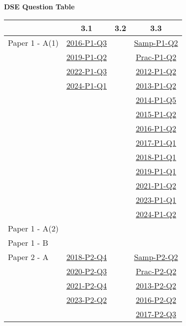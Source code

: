 \documentclass[12pt, a4paper]{article}
\begin{document}
\begin{absolutelynopagebreak}
\begin{center}
\textbf{DSE Question Table}
\end{center}
\begin{center}
\begin{tabular}{|l|c|c|c|}
\hline
        & 3.1 & 3.2 & 3.3 \\\hline
\hline
Paper 1 - A(1)& \hyperref[DSE2016-CoreP1-Q03]{2016-P1-Q3} &  & \hyperref[DSE2012S-CoreP1-Q02]{Samp-P1-Q2} \\
& \hyperref[DSE2019-CoreP1-Q02]{2019-P1-Q2} &  & \hyperref[DSE2012P-CoreP1-Q02]{Prac-P1-Q2} \\
& \hyperref[DSE2022-CoreP1-Q03]{2022-P1-Q3} &  & \hyperref[DSE2012-CoreP1-Q02]{2012-P1-Q2} \\
& \hyperref[DSE2024-CoreP1-Q01]{2024-P1-Q1} &  & \hyperref[DSE2013-CoreP1-Q02]{2013-P1-Q2} \\
&  &  & \hyperref[DSE2014-CoreP1-Q05]{2014-P1-Q5} \\
&  &  & \hyperref[DSE2015-CoreP1-Q02]{2015-P1-Q2} \\
&  &  & \hyperref[DSE2016-CoreP1-Q02]{2016-P1-Q2} \\
&  &  & \hyperref[DSE2017-CoreP1-Q01]{2017-P1-Q1} \\
&  &  & \hyperref[DSE2018-CoreP1-Q01]{2018-P1-Q1} \\
&  &  & \hyperref[DSE2019-CoreP1-Q01]{2019-P1-Q1} \\
&  &  & \hyperref[DSE2021-CoreP1-Q02]{2021-P1-Q2} \\
&  &  & \hyperref[DSE2023-CoreP1-Q01]{2023-P1-Q1} \\
&  &  & \hyperref[DSE2024-CoreP1-Q02]{2024-P1-Q2} \\
\hline
Paper 1 - A(2)&  &  &  \\
\hline
Paper 1 - B&  &  &  \\
\hline
\hline
Paper 2 - A& \hyperref[DSE2018-CoreP2-Q04]{2018-P2-Q4} &  & \hyperref[DSE2012S-CoreP2-Q02]{Samp-P2-Q2} \\
& \hyperref[DSE2020-CoreP2-Q03]{2020-P2-Q3} &  & \hyperref[DSE2012P-CoreP2-Q02]{Prac-P2-Q2} \\
& \hyperref[DSE2021-CoreP2-Q04]{2021-P2-Q4} &  & \hyperref[DSE2013-CoreP2-Q02]{2013-P2-Q2} \\
& \hyperref[DSE2023-CoreP2-Q02]{2023-P2-Q2} &  & \hyperref[DSE2016-CoreP2-Q02]{2016-P2-Q2} \\
&  &  & \hyperref[DSE2017-CoreP2-Q03]{2017-P2-Q3} \\

\end{tabular}
\end{center}
\end{absolutelynopagebreak}
\end{document}
